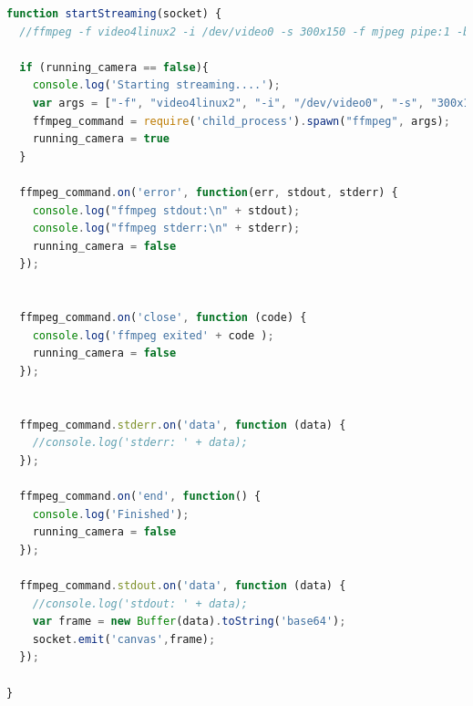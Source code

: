 \begin{lstlisting}[language=JavaScript]
function startStreaming(socket) {
  //ffmpeg -f video4linux2 -i /dev/video0 -s 300x150 -f mjpeg pipe:1 -b:v 28k -bufsize 28k

  if (running_camera == false){
    console.log('Starting streaming....');
    var args = ["-f", "video4linux2", "-i", "/dev/video0", "-s", "300x150","-f","mjpeg", "pipe:1", "-b:v 28k", "-bufsize 28k"]
    ffmpeg_command = require('child_process').spawn("ffmpeg", args);
    running_camera = true
  }

  ffmpeg_command.on('error', function(err, stdout, stderr) {
    console.log("ffmpeg stdout:\n" + stdout);
    console.log("ffmpeg stderr:\n" + stderr);
    running_camera = false
  });


  ffmpeg_command.on('close', function (code) {
    console.log('ffmpeg exited' + code );
    running_camera = false
  });


  ffmpeg_command.stderr.on('data', function (data) {
    //console.log('stderr: ' + data);
  });

  ffmpeg_command.on('end', function() {
    console.log('Finished');
    running_camera = false
  });

  ffmpeg_command.stdout.on('data', function (data) {
    //console.log('stdout: ' + data);
    var frame = new Buffer(data).toString('base64');
    socket.emit('canvas',frame);
  });

}

\end{lstlisting}

